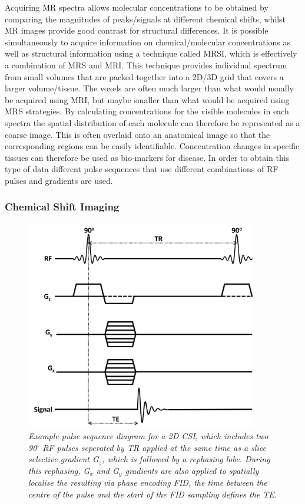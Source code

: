 Acquiring MR spectra allows molecular concentrations to be obtained by comparing the magnitudes of peaks/signals at different chemical shifts, whilst MR images provide good contrast for structural differences. It is possible simultaneously to acquire information on chemical/molecular concentrations as well as structural information using a technique called \ac{MRSI}, which is effectively a combination of \ac{MRS} and MRI. This technique provides individual spectrum from small volumes that are packed together into a 2D/3D grid that covers a larger volume/tissue. The voxels are often much larger than what would usually be acquired using \ac{MRI}, but maybe smaller than what would be acquired using \ac{MRS} strategies. By calculating concentrations for the visible molecules in each spectra the spatial distribution of each molecule can therefore be represented as a coarse image. This is often overlaid onto an anatomical image so that the corresponding regions can be easily identifiable. Concentration changes in specific tissues can therefore be used as bio-markers for disease. In order to obtain this type of data different pulse sequences that use different combinations of \ac{RF} pulses and gradients are used. 

\subsubsection{Chemical Shift Imaging}

\begin{figure}
    \centering
    \includegraphics[width=0.9\textwidth]{Figures/Theory/CSI_sequence.png}
    \caption{\textit{Example pulse sequence diagram for a 2D \ac{CSI}, which includes two 90$^\circ$ \ac{RF} pulses seperated by \ac{TR} applied at the same time as a slice selective gradient G$_z$, which is followed by a rephasing lobe. During this rephasing, G$_x$ and G$_y$ gradients are also applied to spatially localise the resulting via phase encoding \ac{FID}, the time between the centre of the pulse and the start of the \ac{FID} sampling defines the \ac{TE}.}}
    \label{fig:theory:CSI}
\end{figure}

